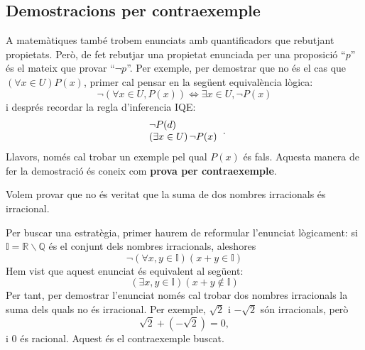 \subsection{Demostracions per contraexemple}

A matemàtiques també trobem enunciats amb quantificadors que
rebutjant propietats. Però, de fet rebutjar una propietat enunciada per
una proposició \enquote{$p$} és el mateix que provar \enquote{$\lnot p$}. Per
exemple, per demostrar que no és el cas que $\left( \forall x\in
U\right) P(x)$, primer cal pensar en la següent equivalència lògica:\begin{equation*}
\lnot\left( \forall x\in U,P(x)\right) \Longleftrightarrow\exists x\in
U,\lnot P\left( x\right)
\end{equation*}
i després recordar la regla d'inferencia IQE:\begin{equation*}
\begin{tabular}{l}
$\lnot P(d)$ \\
$\left( \exists x\in U\right) \lnot P(x)$\end{tabular}
\text{.}
\end{equation*}
Llavors, només cal trobar un exemple pel qual $P(x)$ és fals.
Aquesta manera de fer la demostració és coneix com \textbf{prova per
contraexemple}.

\begin{exemple}
Volem provar que no és veritat que la suma de dos nombres irracionals
és irracional.
\end{exemple}

\begin{solucio}
Per buscar una estratègia, primer haurem de reformular l'enunciat lògicament: si $\mathbb{I}=\mathbb{R}\smallsetminus\mathbb{Q}$ és el
conjunt dels nombres irracionals, aleshores\begin{equation*}
\lnot\left( \forall x,y\in\mathbb{I}\right) \left( x+y\in\mathbb{I}\right)
\end{equation*}
Hem vist que aquest enunciat és equivalent al següent:\begin{equation*}
\left( \exists x,y\in\mathbb{I}\right) \left( x+y\notin\mathbb{I}\right)
\end{equation*}
Per tant, per demostrar l'enunciat només cal trobar dos nombres
irracionals la suma dels quals no és irracional. Per exemple, $\sqrt{2}$
i $-\sqrt{2}$ són irracionals, però
\begin{equation*}
\sqrt{2}+(-\sqrt{2})=0,
\end{equation*}
i $0$ és racional. Aquest és el contraexemple buscat.
\end{solucio}

